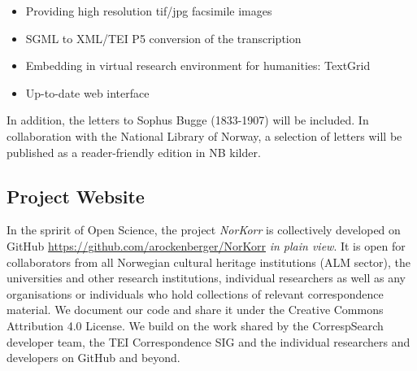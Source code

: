 \documentclass[runningheads]{llncs}
\begin{document}
\begin{itemize}
\tightlist
\item
  Providing high resolution tif/jpg facsimile images
\item
  SGML to XML/TEI P5 conversion of the transcription
\item
  Embedding in virtual research environment for humanities: TextGrid
\item
  Up-to-date web interface
\end{itemize}

In addition, the letters to Sophus Bugge (1833-1907) will be included.
In collaboration with the National Library of Norway, a selection of
letters will be published as a reader-friendly edition in NB kilder.

\subsection{Project Website}\label{project-website}

In the spririt of Open Science, the project \textit{NorKorr} is collectively developed on GitHub  \url{https://github.com/arockenberger/NorKorr} \textit{in plain
view}. It is open for collaborators from all Norwegian cultural heritage
institutions (ALM sector), the universities and other research
institutions, individual researchers as well as any organisations or individuals who hold collections of relevant
correspondence material. 
We document our code and share it under the
Creative Commons Attribution 4.0 License. We build on the work shared by
the CorrespSearch developer team, the TEI Correspondence SIG and the individual
researchers and developers on GitHub and beyond.
\end{document}
